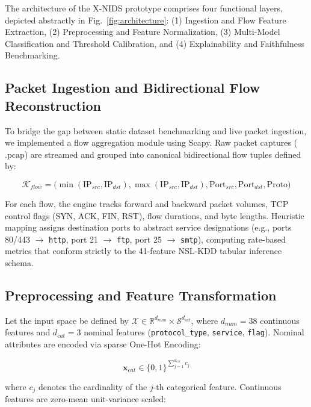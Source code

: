 \documentclass[conference]{IEEEtran}
\begin{document}
The architecture of the X-NIDS prototype comprises four functional layers, depicted abstractly in Fig.~\ref{fig:architecture}: (1) Ingestion and Flow Feature Extraction, (2) Preprocessing and Feature Normalization, (3) Multi-Model Classification and Threshold Calibration, and (4) Explainability and Faithfulness Benchmarking.

\subsection{Packet Ingestion and Bidirectional Flow Reconstruction}

To bridge the gap between static dataset benchmarking and live packet ingestion, we implemented a flow aggregation module using Scapy. Raw packet captures ($\text{.pcap}$) are streamed and grouped into canonical bidirectional flow tuples defined by:

\begin{equation}
\mathcal{K}_{flow} = \Big(\min(\text{IP}_{src}, \text{IP}_{dst}), \max(\text{IP}_{src}, \text{IP}_{dst}), \text{Port}_{src}, \text{Port}_{dst}, \text{Proto}\Big)
\end{equation}

For each flow, the engine tracks forward and backward packet volumes, TCP control flags (SYN, ACK, FIN, RST), flow durations, and byte lengths. Heuristic mapping assigns destination ports to abstract service designations (e.g., ports 80/443 $\rightarrow$ \texttt{http}, port 21 $\rightarrow$ \texttt{ftp}, port 25 $\rightarrow$ \texttt{smtp}), computing rate-based metrics that conform strictly to the 41-feature NSL-KDD tabular inference schema.

\subsection{Preprocessing and Feature Transformation}

Let the input space be defined by $\mathcal{X} \in \mathbb{R}^{d_{num}} \times \mathcal{S}^{d_{cat}}$, where $d_{num} = 38$ continuous features and $d_{cat} = 3$ nominal features (\texttt{protocol\_type}, \texttt{service}, \texttt{flag}). Nominal attributes are encoded via sparse One-Hot Encoding:

\begin{equation}
\mathbf{x}_{cat} \in \{0, 1\}^{\sum_{j=1}^{d_{cat}} c_j}
\end{equation}

where $c_j$ denotes the cardinality of the $j$-th categorical feature. Continuous features are zero-mean unit-variance scaled:
\end{document}
